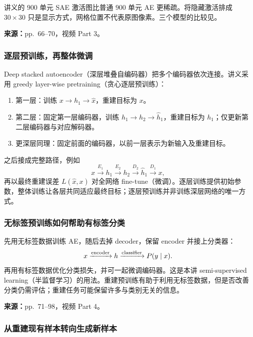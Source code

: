 讲义的 $900$ 单元 SAE 激活图比普通 $900$ 单元 AE 更稀疏。将隐藏激活排成 $30\times30$ 只是显示方式，网格位置不代表原图像素。三个模型的比较见。


\textbf{来源：}pp.~66--70，视频 Part 3。

\subsubsection{逐层预训练，再整体微调}

Deep stacked autoencoder（深层堆叠自编码器）把多个编码器依次连接。讲义采用 greedy layer-wise pretraining（贪心逐层预训练）：
\begin{enumerate}
 \item 第一层：训练 $x\to h_1\to\hat x$，重建目标为 $x$。
 \item 第二层：固定第一层编码器，训练 $h_1\to h_2\to\hat h_1$，重建目标为 $h_1$；仅更新第二层编码器与对应解码器。
 \item 更深层同理：固定前面的编码器，以前一层表示为新输入及重建目标。
\end{enumerate}
之后接成完整路径，例如
\[
 x\xrightarrow{E_1}h_1\xrightarrow{E_2}h_2
 \xrightarrow{D_2}\hat h_1\xrightarrow{D_1}\hat x,
\]
再以最终重建误差 $L(\hat x,x)$ 对全网络 fine-tune（微调）。逐层训练提供初始参数，整体训练让各层共同适应最终目标；逐层预训练并非训练深层网络的唯一方式。

\subsubsection{无标签预训练如何帮助有标签分类}

先用无标签数据训练 AE，随后去掉 decoder，保留 encoder 并接上分类器：
\[
 x\xrightarrow{\rm encoder}h\xrightarrow{\rm classifier}P(y\mid x).
\]
再用有标签数据优化分类损失，并可一起微调编码器。这是本讲 semi-supervised learning（半监督学习）的用法。重建预训练有助于利用无标签数据，但是否改善分类仍需评估；重建任务可能保留许多与类别无关的信息。


\textbf{来源：}pp.~71--98，视频 Part 4。

\subsubsection{从重建现有样本转向生成新样本}


